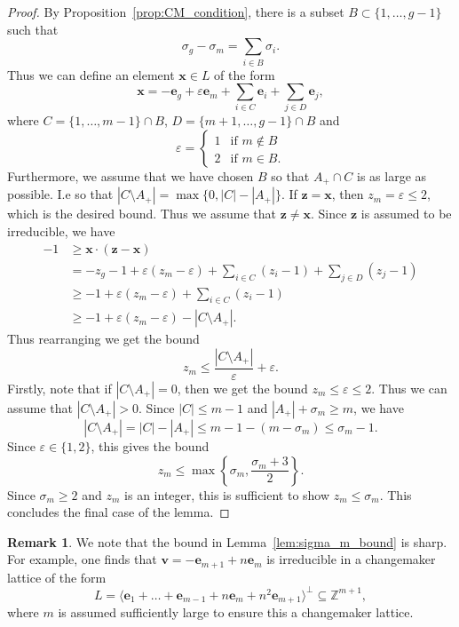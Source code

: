 \documentclass{amsart} %
\newcommand{\Z}{\mathbb{Z}}
\newcommand{\e}{\bm{e}}
\newcommand{\bv}{\bm{v}}
\theoremstyle{thm}
\theoremstyle{definition}
\newtheorem{rem}[Theorem]{Remark}
\numberwithin{equation}{section}
\begin{document}
\begin{proof}
By Proposition~\ref{prop:CM_condition}, there is a subset
$B\subset \{1, \dots, g-1 \}$ such that
\[
\sigma_g - \sigma_m= \sum_{i\in B}\sigma_i.
\]
Thus we can define an element $\bm{x}\in L$ of the form
\[
\bm{x}=-\e_g + \varepsilon \e_m + \sum_{i\in C} \e_i +\sum_{j\in D} \e_j,
\]
where $C=\{1,\dots, m-1\}\cap B$, $D= \{m+1, \dots, g-1\}\cap B$ and
\[
\varepsilon=\begin{cases}
    1 &\text{if $m\not\in B$}\\
    2 &\text{if $m\in B$.}
\end{cases}
\]
Furthermore, we assume that we have chosen $B$ so that $A_+\cap C$ is as large as possible. I.e so that $|C\setminus A_+|=\max\{0, |C|-|A_+| \}$. If $\bm{z}=\bm{x}$, then $z_m=\varepsilon\leq 2$, which is the desired bound. Thus we assume that $\bm{z}\neq \bm{x}$.
Since $\bm{z}$ is assumed to be irreducible, we have 
\begin{align*}
    -1&\geq \bm{x}\cdot (\bm{z}-\bm{x}) \\
    &=-z_g-1 + \varepsilon(z_m -\varepsilon) + \sum_{i\in C} (z_i-1) +\sum_{j\in D} (z_j-1)\\
    &\geq -1 + \varepsilon(z_m -\varepsilon) + \sum_{i\in C} (z_i-1)\\
    &\geq -1 + \varepsilon(z_m -\varepsilon) -|C\setminus A_+|.
\end{align*}
Thus rearranging we get the bound
\[
z_m\leq \frac{|C\setminus A_+|}{\varepsilon} +\varepsilon.
\]
Firstly, note that if $|C\setminus A_+|=0$, then we get the bound $z_m\leq \varepsilon\leq 2$. Thus we can assume that
$|C\setminus A_+|>0$. Since $|C|\leq m-1$ and $|A_+|+\sigma_m\geq m$, we have 
\[
|C\setminus A_+|=|C|-|A_+|\leq m-1-(m-\sigma_m)\leq \sigma_m -1.
\]
Since $\varepsilon\in \{1,2\}$, this gives the bound
\[
z_m\leq \max\left\{\sigma_m, \frac{\sigma_m+3}{2}\right\}.
\]
Since $\sigma_m\geq 2$ and $z_m$ is an integer, this is sufficient to show $z_m \leq \sigma_m$. This concludes the final case of the lemma.
\end{proof}

\begin{rem}
We note that the bound in Lemma~\ref{lem:sigma_m_bound} is sharp. For example, one finds that
$\bv=-\e_{m+1}+ n \e_m$ is irreducible in a changemaker lattice of the form
\[
L=\langle \e_1 + \dots + \e_{m-1} + n\e_m + n^2 \e_{m+1} \rangle^\bot\subseteq \Z^{m+1},
\]
where $m$ is assumed sufficiently large to ensure this a changemaker lattice.
\end{rem}
\end{document}
